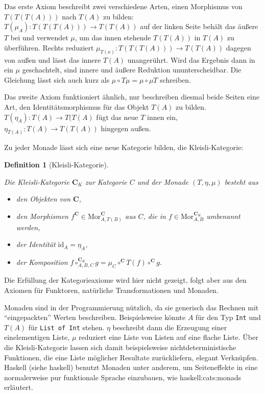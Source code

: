 \documentclass[11pt, a4paper, bibgerm]{scrbook}
\newcommand\icode[1]{\lstinline?#1?}
\newcommand\cref{}
\newcommand\sref{}
\newcommand\ato{\rightarrow} %
\newtheorem{defini}{Definition}
\newcommand{\defi}[2]{%
  \begin{defini}[#1]
    \label{def:#1}
    #2
  \end{defini}
}
\newcommand{\seec}[1]{(siehe \cref{#1})}
\begin{document}
Das erste Axiom beschreibt zwei verschiedene Arten, einen Morphismus von
$T(T(T(A)))$ nach $T(A)$ zu bilden: $T(\mu_A):T(T(T(A))) \ato T(T(A))$
auf der linken Seite behält das äußere $T$ bei und verwendet $\mu$, um
das innen stehende $T(T(A))$ in $T(A)$ zu überführen. Rechts reduziert
$\mu_{T(x)}:T(T(T(A))) \ato T(T(A))$ dagegen von außen und lässt das
innere $T(A)$ unangerührt. Wird das Ergebnis dann in ein $\mu$
geschachtelt, sind innere und äußere Reduktion ununterscheidbar. Die
Gleichung lässt sich auch kurz als $\mu \circ T \mu = \mu \circ \mu T$
schreiben.

Das zweite Axiom funktioniert ähnlich, nur beschreiben diesmal beide
Seiten eine Art, den Identitätsmorphismus für das Objekt $T(A)$ zu
bilden. $T(\eta_A):T(A) \ato T(T(A)$ fügt das neue $T$ innen ein,
$\eta_{T(A)}:T(A) \ato T(T(A))$ hingegen außen.

Zu jeder Monade lässt sich eine neue Kategorie bilden, die Kleisli-Kategorie:
\defi{Kleisli-Kategorie}{
Die Kleisli-Kategorie $\mathbf{C}_K$ zur Kategorie $C$ und der
Monade $(T,\eta,\mu)$ besteht aus
\begin{itemize}
\item den Objekten von $\mathbf{C}$,
\item den Morphismen $f^{\mathbf{C}} \in
  \mathrm{Mor}^{\mathbf{C}}_{A,T(B)}$ aus $C$, die in $f \in
  \mathrm{Mor}^{\mathbf{C}_K}_{A,B}$ umbenannt werden,
\item der Identität $\mathrm{id}_A = \eta_A$,
\item der Komposition $f \circ^{\mathbf{C}_K}_{A,B,C} g = \mu_C
  \circ^{\mathbf{C}} T(f) \circ^{\mathbf{C}} g$.
\end{itemize}
}
Die Erfüllung der Kategorieaxiome wird hier nicht gezeigt, folgt aber
aus den Axiomen für Funktoren, natürliche Transformationen und Monaden.

Monaden sind in der Programmierung nützlich, da sie generisch das
Rechnen mit "`eingepackten"' Werten beschreiben. Beispielsweise könnte
$A$ für den Typ \icode{Int} und $T(A)$ für \icode{List of Int}
stehen. $\eta$ beschreibt dann die Erzeugung einer einelementigen Liste,
$\mu$ reduziert eine Liste von Listen auf eine flache Liste. Über die
Kleisli-Kategorie lassen sich damit beispielsweise nichtdeterministische
Funktionen, die eine Liste möglicher Resultate zurückliefern, elegant
Verknüpfen. Haskell \seec{haskell} benutzt Monaden unter
anderem, um Seiteneffekte in eine normalerweise pur funktionale Sprache
einzubauen, wie \sref{haskell:cats:monads} erläutert.
\end{document}
